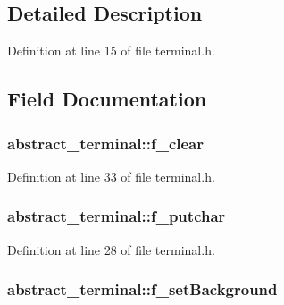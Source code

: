 \subsection{Detailed Description}


Definition at line 15 of file terminal.h.



\subsection{Field Documentation}
\hypertarget{structabstract__terminal_a2b630ff0477104ec3a84324f5de89248}{
\subsubsection[{f\_\-clear}]{ {\bf abstract\_\-terminal::f\_\-clear}}}
\label{structabstract__terminal_a2b630ff0477104ec3a84324f5de89248}


Definition at line 33 of file terminal.h.

\hypertarget{structabstract__terminal_ae20f5f7f2622c07f12b889c0c9082826}{
\subsubsection[{f\_\-putchar}]{ {\bf abstract\_\-terminal::f\_\-putchar}}}
\label{structabstract__terminal_ae20f5f7f2622c07f12b889c0c9082826}


Definition at line 28 of file terminal.h.

\hypertarget{structabstract__terminal_a5b7c2b270c674339ed184412a2bfb89e}{
\subsubsection[{f\_\-setBackground}]{ {\bf abstract\_\-terminal::f\_\-setBackground}}}
\label{structabstract__terminal_a5b7c2b270c674339ed184412a2bfb89e}



